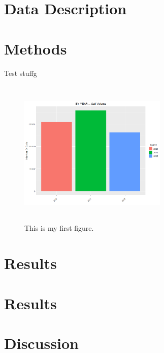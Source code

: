 \documentclass[12pt]{article}
\begin{document}
\section*{Data Description}



\section*{Methods}
Test stuffg
\begin{figure}[H]
    \centering
    \includegraphics[width=200pt,height=200pt]{By Year.png}
    \caption{This is my first figure.}
    \label{fig:Year}
  \end{figure}

\section*{Results}


\section*{Results}

\section*{Discussion}




\end{document}
